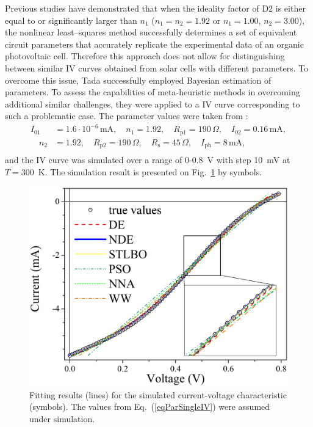 \documentclass[a4paper,fleqn]{cas-sc}
\begin{document}
Previous studies have demonstrated \cite{Tada2015Organic,Tada2021} that when the ideality factor of D2 is either equal to or significantly larger than $n_1$
($n_1=n_2=1.92$ or $n_1=1.00$, $n_2=3.00$), the nonlinear least--squares method successfully determines a set of equivalent circuit parameters
that accurately replicate the experimental data of an organic photovoltaic cell.
Therefore this approach does not allow for distinguishing between similar IV curves obtained from solar cells with different parameters.
To overcome this issue, Tada \cite{Tada2021} successfully employed Bayesian estimation of parameters.
To assess the capabilities of meta-heuristic methods in overcoming additional similar challenges,
they were applied to a IV curve corresponding to such a problematic case.
The parameter values were taken from \cite{Tada2021}:
\begin{equation}
\label{eqParSingleIV}
\begin{split}
I_{01}&=1.6\cdot10^{-6}\,\text{mA},\quad n_1=1.92,\quad R_\mathrm{p1}=190\,\Omega,\quad I_{02}=0.16\,\text{mA},\\
\quad n_2&=1.92, \quad R_\mathrm{p2}=190\,\Omega,\quad R_\mathrm{s}=45\,\Omega,\quad I_\mathrm{ph}=8\,\text{mA},\\
\end{split}
\end{equation}
and the IV curve was simulated over a range of 0-0.8~V with step 10~mV at $T=300$~K.
The simulation result is presented on Fig.~\ref{figSigleIV} by symbols.


\begin{figure}[]
	\centering
		\includegraphics[width=0.5\columnwidth]{IVsimple}
	  \caption{Fitting results (lines) for the simulated current-voltage characteristic (symbols).
             The values from  Eq.~(\ref{eqParSingleIV}) were assumed under simulation.}\label{figSigleIV}
\end{figure}
\end{document}
